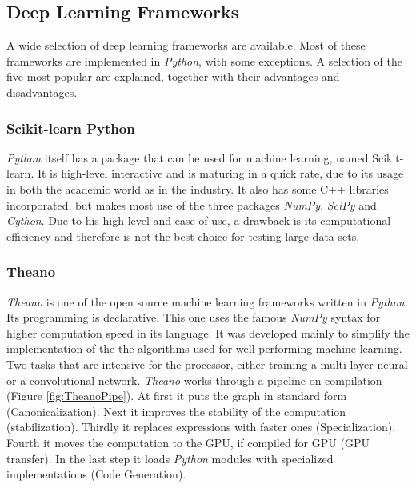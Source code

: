 \documentclass[10pt,a4paper]{report}
\begin{document}
	\clearpage
	
	\subsection{Deep Learning Frameworks}
	
	A wide selection of deep learning frameworks are available. Most of these 
	frameworks are implemented in \textit{Python}, with some exceptions. A selection of 
	the five most popular are explained, together with their advantages and 
	disadvantages.
	
	\subsubsection{Scikit-learn Python}
	
	\textit{Python} itself has a package that can be used for machine learning, named 
	Scikit-learn. It is high-level interactive and is maturing in a quick rate, 
	due to its usage in both the academic world as in the industry. It also has 
	some C++ libraries incorporated, but makes most use of the three packages 
	\textit{NumPy}, \textit{SciPy} and \textit{Cython}. Due to his high-level and ease of use, a drawback 
	is its computational efficiency and therefore is not the best choice for 
	testing large data sets. \cite{pedregosa2011scikit}
	
	\subsubsection{Theano}
	
	\textit{Theano} is one of the open source machine learning frameworks written in 
	\textit{Python}. \cite{bergstra2010theano} Its programming is declarative. 
	 \cite{rampasek2016tensorflow} This one uses the famous \textit{NumPy} syntax for 
	higher computation speed 
	in its language. It was developed mainly to simplify the implementation of 
	the the algorithms used for well performing machine learning. Two tasks 
	that are intensive for the processor, either training a multi-layer neural 
	or a convolutional network. \textit{Theano} works through a pipeline on compilation 
	(Figure \ref{fig:TheanoPipe}). At first it puts the graph in standard form 
	(Canonicalization). Next it improves the stability of the computation 
	(stabilization). Thirdly it replaces expressions with faster ones 
	(Specialization). Fourth it moves the computation to the GPU, if compiled 
	for GPU (GPU transfer). In the last step it loads \textit{Python} modules with 
	specialized implementations (Code Generation).  \cite{bergstra2010theano}
	
\end{document}
